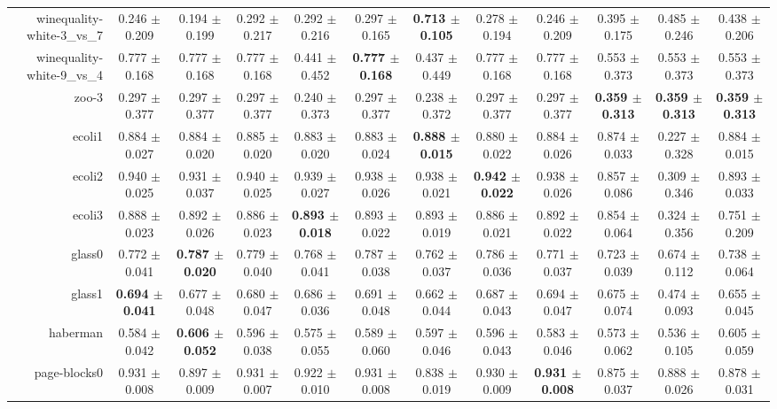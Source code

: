 \begin{table}[!ht]
{\begin{tabular}{r c c c c c c c c c c c}
winequality-white-3\_vs\_7 & 0.246 $\pm$ 0.209 & 0.194 $\pm$ 0.199 & 0.292 $\pm$ 0.217 & 0.292 $\pm$ 0.216 & 0.297 $\pm$ 0.165 & \textbf{0.713 $\pm$ 0.105} & 0.278 $\pm$ 0.194 & 0.246 $\pm$ 0.209 & 0.395 $\pm$ 0.175 & 0.485 $\pm$ 0.246 & 0.438 $\pm$ 0.206 \\
winequality-white-9\_vs\_4 & 0.777 $\pm$ 0.168 & 0.777 $\pm$ 0.168 & 0.777 $\pm$ 0.168 & 0.441 $\pm$ 0.452 & \textbf{0.777 $\pm$ 0.168} & 0.437 $\pm$ 0.449 & 0.777 $\pm$ 0.168 & 0.777 $\pm$ 0.168 & 0.553 $\pm$ 0.373 & 0.553 $\pm$ 0.373 & 0.553 $\pm$ 0.373 \\
zoo-3 & 0.297 $\pm$ 0.377 & 0.297 $\pm$ 0.377 & 0.297 $\pm$ 0.377 & 0.240 $\pm$ 0.373 & 0.297 $\pm$ 0.377 & 0.238 $\pm$ 0.372 & 0.297 $\pm$ 0.377 & 0.297 $\pm$ 0.377 & \textbf{0.359 $\pm$ 0.313} & \textbf{0.359 $\pm$ 0.313} & \textbf{0.359 $\pm$ 0.313} \\
ecoli1 & 0.884 $\pm$ 0.027 & 0.884 $\pm$ 0.020 & 0.885 $\pm$ 0.020 & 0.883 $\pm$ 0.020 & 0.883 $\pm$ 0.024 & \textbf{0.888 $\pm$ 0.015} & 0.880 $\pm$ 0.022 & 0.884 $\pm$ 0.026 & 0.874 $\pm$ 0.033 & 0.227 $\pm$ 0.328 & 0.884 $\pm$ 0.015 \\
ecoli2 & 0.940 $\pm$ 0.025 & 0.931 $\pm$ 0.037 & 0.940 $\pm$ 0.025 & 0.939 $\pm$ 0.027 & 0.938 $\pm$ 0.026 & 0.938 $\pm$ 0.021 & \textbf{0.942 $\pm$ 0.022} & 0.938 $\pm$ 0.026 & 0.857 $\pm$ 0.086 & 0.309 $\pm$ 0.346 & 0.893 $\pm$ 0.033 \\
ecoli3 & 0.888 $\pm$ 0.023 & 0.892 $\pm$ 0.026 & 0.886 $\pm$ 0.023 & \textbf{0.893 $\pm$ 0.018} & 0.893 $\pm$ 0.022 & 0.893 $\pm$ 0.019 & 0.886 $\pm$ 0.021 & 0.892 $\pm$ 0.022 & 0.854 $\pm$ 0.064 & 0.324 $\pm$ 0.356 & 0.751 $\pm$ 0.209 \\
glass0 & 0.772 $\pm$ 0.041 & \textbf{0.787 $\pm$ 0.020} & 0.779 $\pm$ 0.040 & 0.768 $\pm$ 0.041 & 0.787 $\pm$ 0.038 & 0.762 $\pm$ 0.037 & 0.786 $\pm$ 0.036 & 0.771 $\pm$ 0.037 & 0.723 $\pm$ 0.039 & 0.674 $\pm$ 0.112 & 0.738 $\pm$ 0.064 \\
glass1 & \textbf{0.694 $\pm$ 0.041} & 0.677 $\pm$ 0.048 & 0.680 $\pm$ 0.047 & 0.686 $\pm$ 0.036 & 0.691 $\pm$ 0.048 & 0.662 $\pm$ 0.044 & 0.687 $\pm$ 0.043 & 0.694 $\pm$ 0.047 & 0.675 $\pm$ 0.074 & 0.474 $\pm$ 0.093 & 0.655 $\pm$ 0.045 \\
haberman & 0.584 $\pm$ 0.042 & \textbf{0.606 $\pm$ 0.052} & 0.596 $\pm$ 0.038 & 0.575 $\pm$ 0.055 & 0.589 $\pm$ 0.060 & 0.597 $\pm$ 0.046 & 0.596 $\pm$ 0.043 & 0.583 $\pm$ 0.046 & 0.573 $\pm$ 0.062 & 0.536 $\pm$ 0.105 & 0.605 $\pm$ 0.059 \\
page-blocks0 & 0.931 $\pm$ 0.008 & 0.897 $\pm$ 0.009 & 0.931 $\pm$ 0.007 & 0.922 $\pm$ 0.010 & 0.931 $\pm$ 0.008 & 0.838 $\pm$ 0.019 & 0.930 $\pm$ 0.009 & \textbf{0.931 $\pm$ 0.008} & 0.875 $\pm$ 0.037 & 0.888 $\pm$ 0.026 & 0.878 $\pm$ 0.031 \\

\end{tabular}}
\end{table}
